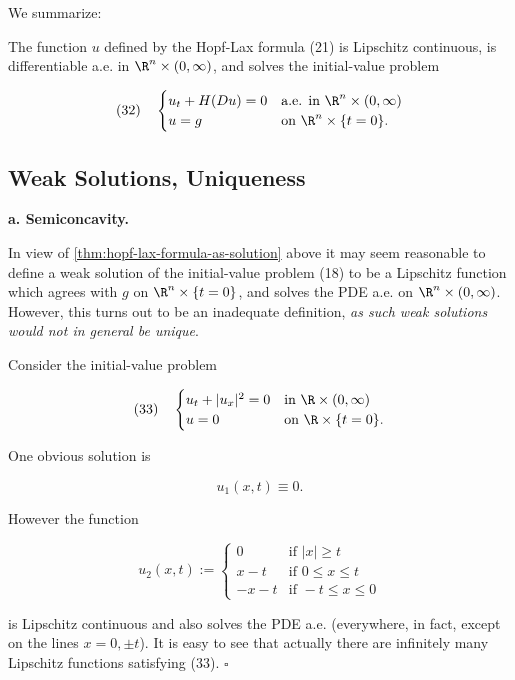 We summarize:

\begin{theorem}
\label{thm:hopf-lax-formula-as-solution}
The function $u$ defined by the Hopf-Lax formula (21) is Lipschitz continuous, is differentiable a.e. in $\R^n \times (0,\infty)$, and solves the initial-value problem

$$(32) \quad \begin{cases} u_t + H(Du) = 0 & \text{a.e. in } \R^n \times (0,\infty) \\ u = g & \text{on } \R^n \times \{t = 0\}. \end{cases}$$
\end{theorem}

\subsection{Weak Solutions, Uniqueness}
\label{sec:hj-weak-solutions-uniqueness}

\textbf{a. Semiconcavity.}

In view of \cref{thm:hopf-lax-formula-as-solution} above it may seem reasonable to define a weak solution of the initial-value problem (18) to be a Lipschitz function which agrees with $g$ on $\R^n \times \{t = 0\}$, and solves the PDE a.e. on $\R^n \times (0,\infty)$. However, this turns out to be an inadequate definition, \textit{as such weak solutions would not in general be unique}.

\begin{example}
\label{ex:nonuniqueness-weak-solutions-hj}
Consider the initial-value problem

$$(33) \quad \begin{cases} u_t + |u_x|^2 = 0 & \text{in } \R \times (0,\infty) \\ u = 0 & \text{on } \R \times \{t = 0\}. \end{cases}$$

One obvious solution is

$$u_1(x,t) \equiv 0.$$

However the function

$$u_2(x,t) := \begin{cases} 0 & \text{if } |x| \geq t \\ x - t & \text{if } 0 \leq x \leq t \\ -x - t & \text{if } -t \leq x \leq 0 \end{cases}$$

is Lipschitz continuous and also solves the PDE a.e. (everywhere, in fact, except on the lines $x = 0, \pm t$). It is easy to see that actually there are infinitely many Lipschitz functions satisfying (33). $\square$
\end{example}

